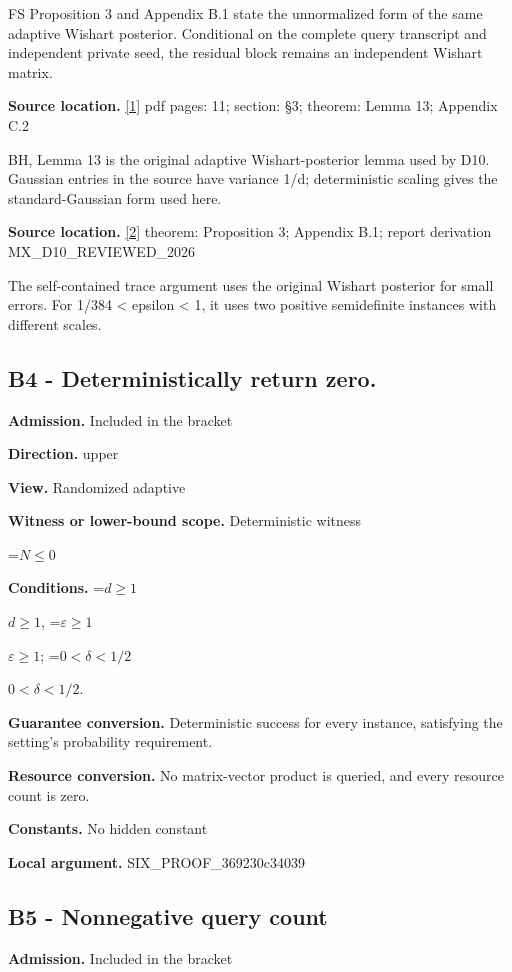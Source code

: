 \documentclass[10pt,a4paper]{article}
\newcommand{\AtlasMath}[1]{\par\begingroup\centering\setbox0=\hbox{$\displaystyle #1$}\ifdim\wd0>1.4\linewidth\typeout{ATLAS WIDE FORMULA: \the\wd0}\fi\ifdim\wd0>\linewidth\resizebox{\linewidth}{!}{\box0}\else\box0\fi\par\endgroup}
\newcommand{\AtlasInlineMath}[1]{\begingroup\setbox0=\hbox{$#1$}\ifdim\wd0>.4\linewidth\endgroup\AtlasMath{#1}\else\endgroup$#1$\fi}
\begin{document}
FS Proposition 3 and Appendix B.1 state the unnormalized form of the same adaptive Wishart posterior. Conditional on the complete query transcript and independent private seed, the residual block remains an independent Wishart matrix.

\textbf{Source location.} \href{https://proceedings.mlr.press/v125/braverman20a/braverman20a.pdf}{[1]} pdf pages: 11; section: §3; theorem: Lemma 13; Appendix C.2

BH, Lemma 13 is the original adaptive Wishart-posterior lemma used by D10. Gaussian entries in the source have variance 1/d; deterministic scaling gives the standard-Gaussian form used here.

\textbf{Source location.} \href{https://arxiv.org/pdf/2402.09379v3}{[2]} theorem: Proposition 3; Appendix B.1; report derivation MX\_\allowbreak{}D10\_\allowbreak{}REVIEWED\_\allowbreak{}2026

The self-contained trace argument uses the original Wishart posterior for small errors. For 1/384 < epsilon < 1, it uses two positive semidefinite instances with different scales.

\subsection{B4 - Deterministically return zero.}
\textbf{Admission.} Included in the bracket

\textbf{Direction.} upper

\textbf{View.} Randomized adaptive

\textbf{Witness or lower-bound scope.} Deterministic witness

\AtlasMath{N\le0}
\textbf{Conditions.} \AtlasInlineMath{d\ge1}, \AtlasInlineMath{\varepsilon\ge1}; \AtlasInlineMath{0<\delta<1/2}.

\textbf{Guarantee conversion.} Deterministic success for every instance, satisfying the setting's probability requirement.

\textbf{Resource conversion.} No matrix-vector product is queried, and every resource count is zero.

\textbf{Constants.} No hidden constant

\textbf{Local argument.} SIX\_\allowbreak{}PROOF\_\allowbreak{}369230c34039

\subsection{B5 - Nonnegative query count}
\textbf{Admission.} Included in the bracket
\end{document}
